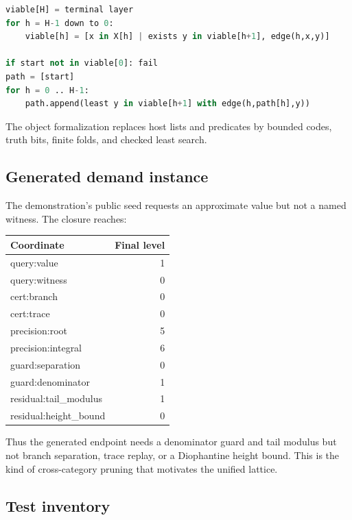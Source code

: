 \begin{lstlisting}[language=Python]
viable[H] = terminal layer
for h = H-1 down to 0:
    viable[h] = [x in X[h] | exists y in viable[h+1], edge(h,x,y)]

if start not in viable[0]: fail
path = [start]
for h = 0 .. H-1:
    path.append(least y in viable[h+1] with edge(h,path[h],y))
\end{lstlisting}
The object formalization replaces host lists and predicates by bounded codes,
truth bits, finite folds, and checked least search.

\subsection{Generated demand instance}

The demonstration's public seed requests an approximate value but not a named
witness.  The closure reaches:
\begin{center}
\begin{tabular}{@{}lr@{}}
\toprule
Coordinate & Final level \\
\midrule
query:value & 1 \\
query:witness & 0 \\
cert:branch & 0 \\
cert:trace & 0 \\
precision:root & 5 \\
precision:integral & 6 \\
guard:separation & 0 \\
guard:denominator & 1 \\
residual:tail\_modulus & 1 \\
residual:height\_bound & 0 \\
\bottomrule
\end{tabular}
\end{center}
Thus the generated endpoint needs a denominator guard and tail modulus but not
branch separation, trace replay, or a Diophantine height bound.  This is the
kind of cross-category pruning that motivates the unified lattice.

\subsection{Test inventory}


